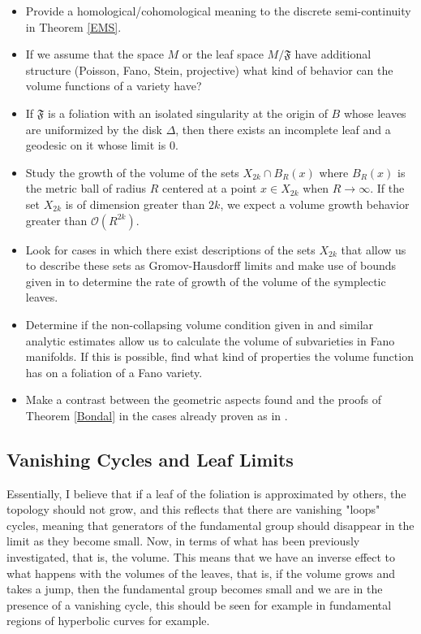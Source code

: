 \documentclass[12pt,twoside,a4paper]{report}
\begin{document}
\begin{itemize}
        \item Provide a homological/cohomological meaning to the discrete semi-continuity in Theorem \ref{EMS}.

        \item If we assume that the space $M$ or the leaf space $M/\mathfrak{F}$ have additional structure (Poisson, Fano, Stein, projective)
        what kind of behavior can the volume functions of a variety have?

        \item If $\mathfrak{F}$ is a foliation with an isolated singularity at the origin of $B$ whose leaves are uniformized by the disk $\Delta$,
        then there exists an incomplete leaf and a geodesic on it whose limit is $0$.

        \item Study the growth of the volume of the sets $X_{2k}\cap B_{R}(x)$ where $B_R(x)$ is the metric ball
        of radius $R$ centered at a point $x\in X_{2k}$ when $R\rightarrow\infty$. If the set $X_{2k}$ is
        of dimension greater than $2k$, we expect a volume growth behavior greater than $\mathcal{O}(R^{2k}).$

        \item Look for cases in which there exist descriptions of the sets $X_{2k}$ that allow us to describe these sets
        as Gromov-Hausdorff limits and make use of bounds given in \cite{D-SS} to determine the rate of growth
        of the volume of the symplectic leaves.

        \item Determine if the non-collapsing volume condition given in \cite{D-SS} and similar analytic estimates
        allow us to calculate the volume of subvarieties in Fano manifolds. If this is possible, find
        what kind of properties the volume function has on a foliation of a Fano variety.

        \item Make a contrast between the geometric aspects found and the proofs of Theorem \ref{Bondal} in the
        cases already proven as in \cite{Gua-Pym}.

\end{itemize}

\subsection{Vanishing Cycles and Leaf Limits}
\noindent Essentially, I believe that if a leaf of the foliation is approximated by others, the topology should not grow, and this reflects that there are vanishing "loops" cycles, meaning that generators of the fundamental group should disappear in the limit as they become small. Now, in terms of what has been previously investigated, that is, the volume. This means that we have an inverse effect to what happens with the volumes of the leaves, that is, if the volume grows and takes a jump, then the fundamental group becomes small and we are in the presence of a vanishing cycle, this should be seen for example in fundamental regions of hyperbolic curves for example.
\end{document}
